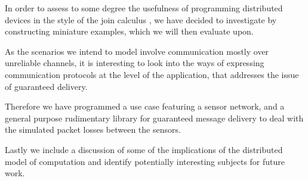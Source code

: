 
In order to assess to some degree the usefulness of programming
distributed devices in the style of the join calculus , we have decided to investigate by constructing
miniature examples, which we will then evaluate upon.

As the scenarios we intend to model involve communication mostly over
unreliable channels, it is interesting to look into the ways of
expressing communication protocols at the level of the application,
that addresses the issue of guaranteed delivery.

Therefore we have programmed a use case featuring a sensor network,
and a general purpose rudimentary library for guaranteed message
delivery to deal with the simulated packet losses between the sensors.

Lastly we include a discussion of some of the implications of the distributed
model of computation and identify potentially interesting subjects for future
work.


